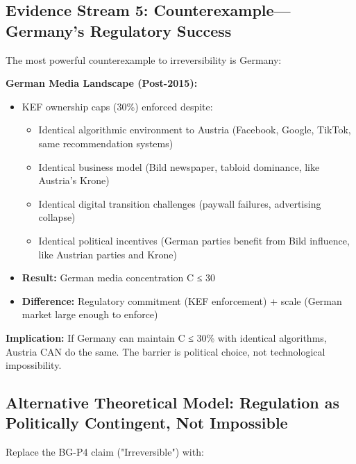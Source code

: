 \subsection*{Evidence Stream 5: Counterexample—Germany's Regulatory Success}

The most powerful counterexample to irreversibility is Germany:

\textbf{German Media Landscape (Post-2015):}
\begin{itemize}
\item KEF ownership caps (30\%) enforced despite:
  \begin{itemize}
  \item Identical algorithmic environment to Austria (Facebook, Google, TikTok, same recommendation systems)
  \item Identical business model (Bild newspaper, tabloid dominance, like Austria's Krone)
  \item Identical digital transition challenges (paywall failures, advertising collapse)
  \item Identical political incentives (German parties benefit from Bild influence, like Austrian parties and Krone)
  \end{itemize}
\item \textbf{Result:} German media concentration C ≤ 30%
\item \textbf{Difference:} Regulatory commitment (KEF enforcement) + scale (German market large enough to enforce)
\end{itemize}

\textbf{Implication:} If Germany can maintain C ≤ 30\% with identical algorithms, Austria CAN do the same. The barrier is political choice, not technological impossibility.

\subsection*{Alternative Theoretical Model: Regulation as Politically Contingent, Not Impossible}

Replace the BG-P4 claim ("Irreversible") with:

